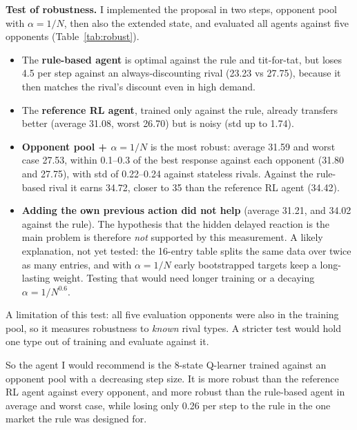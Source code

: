 \documentclass[11pt, a4paper]{article}
\newcommand{\restable}[1]{}
\begin{document}
\textbf{Test of robustness.} I implemented the proposal in two steps, opponent pool with $\alpha = 1/N$, then also the extended state, and evaluated all agents against five opponents (Table~\ref{tab:robust}).

\begin{table}[H]
\centering
\caption{Robustness test: mean reward per step $\pm$ std over 10 seeds, greedy evaluation against each opponent. Last row: best expected reward against that opponent computed from the model.}
\label{tab:robust}
\resizebox{\textwidth}{!}{\restable{robustness.tex}}
\end{table}

\begin{itemize}
    \item The \textbf{rule-based agent} is optimal against the rule and tit-for-tat, but loses 4.5 per step against an always-discounting rival (23.23 vs 27.75), because it then matches the rival's discount even in high demand.
    \item The \textbf{reference RL agent}, trained only against the rule, already transfers better (average 31.08, worst 26.70) but is noisy (std up to 1.74).
    \item \textbf{Opponent pool + $\alpha = 1/N$} is the most robust: average 31.59 and worst case 27.53, within 0.1--0.3 of the best response against each opponent (31.80 and 27.75), with std of 0.22--0.24 against stateless rivals. Against the rule-based rival it earns 34.72, closer to 35 than the reference RL agent (34.42).
    \item \textbf{Adding the own previous action did not help} (average 31.21, and 34.02 against the rule). The hypothesis that the hidden delayed reaction is the main problem is therefore \emph{not} supported by this measurement. A likely explanation, not yet tested: the 16-entry table splits the same data over twice as many entries, and with $\alpha = 1/N$ early bootstrapped targets keep a long-lasting weight. Testing that would need longer training or a decaying $\alpha = 1/N^{0.6}$.
\end{itemize}

A limitation of this test: all five evaluation opponents were also in the training pool, so it measures robustness to \emph{known} rival types. A stricter test would hold one type out of training and evaluate against it.

So the agent I would recommend is the 8-state Q-learner trained against an opponent pool with a decreasing step size. It is more robust than the reference RL agent against every opponent, and more robust than the rule-based agent in average and worst case, while losing only 0.26 per step to the rule in the one market the rule was designed for.
\end{document}
